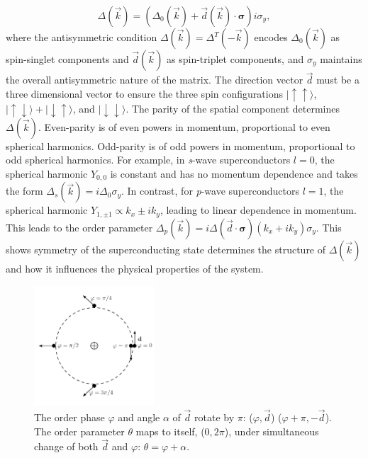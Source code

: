 \begin{equation}
  \Delta (\vec{k}) = \left(\Delta_0 (\vec{k}) + \vec{d}(\vec{k}) \cdot \bm{\sigma}\right) i \sigma_y,
\end{equation}
where the antisymmetric condition $\Delta(\vec{k}) = \Delta^T(-\vec{k})$ encodes $\Delta_0 (\vec{k})$ as spin-singlet components and $\vec{d}(\vec{k})$ as spin-triplet components, and $\sigma_y$ maintains the overall antisymmetric nature of the matrix.
The direction vector $\vec{d}$ must be a three dimensional vector to ensure the three spin configurations
$|\uparrow\uparrow\rangle$, $|\uparrow\downarrow\rangle + |\downarrow\uparrow\rangle$, and $|\downarrow\downarrow\rangle$.
The parity of the spatial component determines $\Delta(\vec{k})$.
Even-parity is of even powers in momentum, proportional to even spherical harmonics.
Odd-parity is of odd powers in momentum, proportional to odd spherical harmonics.
For example, in \textit{s}-wave superconductors $l=0$, the spherical harmonic $Y_{0,0}$ is constant and has no momentum dependence and takes the form
$\Delta_s (\vec{k}) = i\Delta_0 \sigma_y$.
In contrast, for \textit{p}-wave superconductors $l=1$, the spherical harmonic $Y_{1,\pm1} \propto k_x \pm i k_y$, leading to linear dependence in momentum.
This leads to the order parameter
$\Delta_p(\vec{k}) = i\Delta (\vec{d} \cdot \bm{\sigma}) (k_x+ik_y) \sigma_y$.
This shows symmetry of the superconducting state determines the structure of $\Delta(\vec{k})$ and how it influences the physical properties of the system.

\begin{figure}
  \includegraphics[width=0.4\textwidth]{./figures/half-quantum-vortex.pdf}
  \caption{The order phase $\varphi$ and angle $\alpha$ of $\vec{d}$ rotate by $\pi$: ($\varphi , \vec{d}$) \rightarrow ($\varphi+\pi, -\vec{d}$). The order parameter $\theta$ maps to itself, ($0, 2\pi$), under simultaneous change of both $\vec{d}$ and $\varphi$: $\theta = \varphi + \alpha$.}
  \label{fig:half-quantum-vortex}
\end{figure}


